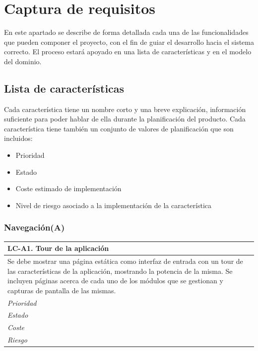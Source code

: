 
\chapter{Captura de requisitos} %
\label{cha:captura_de_requisitos}
	
	En este apartado se describe de forma detallada cada una de las funcionalidades que pueden componer el proyecto, con el fin de guiar el desarrollo hacia el sistema correcto. El proceso estará apoyado en una lista de características y en el modelo del dominio.

% 
%
\section{Lista de características} %
	\label{sec:lista_de_caracteristicas}
	
	Cada característica tiene un nombre corto y una breve explicación, información suficiente para poder hablar de ella durante la planificación del producto. Cada característica tiene también un conjunto de valores de planificación que son incluidos:
	
	\begin{itemize}
		\item{Prioridad}
		\item{Estado}
		\item{Coste estimado de implementación}
		\item{Nivel de riesgo asociado a la implementación de la característica}
	\end{itemize}
	
%
%
\subsection{Navegación(A)} %
	\label{sub:lc_navegacion}
	
	\begin{center}
		\begin{tabularx}{15cm}{|X|}
			\hline 
				\bf{LC-A1. Tour de la aplicación}\\
			\hline
				Se debe mostrar una página estática como interfaz de entrada con un tour de las características de la aplicación, mostrando la potencia de la misma. Se incluyen páginas acerca de cada uno de los módulos que se gestionan y capturas de pantalla de las mismas.\\
			\hline
				\it{Prioridad}\\
			\hline
				\it{Estado}\\
			\hline
				\it{Coste}\\
			\hline
				\it{Riesgo}\\
			\hline
		\end{tabularx}
	\end{center}
	
